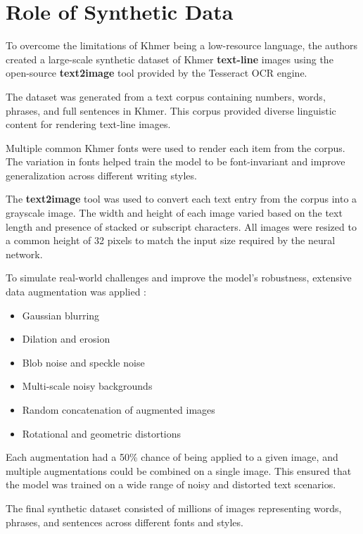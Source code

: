 \section{Role of Synthetic Data}
\label{sec:dl-models}

To overcome the limitations of Khmer being a low-resource language, 
the authors created a large-scale synthetic dataset of Khmer \textbf{text-line} 
images using the open-source \textbf{text2image} tool provided by the Tesseract OCR engine.

The dataset was generated from a text corpus containing numbers, words, phrases, 
and full sentences in Khmer. \citep{buoy2021seq2seq} This corpus provided diverse linguistic content 
for rendering text-line images.

Multiple common Khmer fonts were used to render each item from the corpus. 
The variation in fonts helped train the model to be font-invariant and improve 
generalization across different writing styles.

The \textbf{text2image} tool was used to convert each text entry from the corpus into a 
grayscale image. The width and height of each image varied based on the text 
length and presence of stacked or subscript characters. All images were 
resized to a common height of 32 pixels to match the input size required 
by the neural network.

To simulate real-world challenges and improve the model's robustness, 
extensive data augmentation was applied \citep{buoy2021seq2seq} :
    \begin{itemize}
        \item Gaussian blurring
        \item Dilation and erosion
        \item Blob noise and speckle noise
        \item Multi-scale noisy backgrounds
        \item Random concatenation of augmented images
        \item Rotational and geometric distortions
    \end{itemize}

Each augmentation had a 50\% \citep{buoy2021seq2seq} chance of being applied to a given image, and multiple augmentations could be combined on a single image. This ensured that the model was trained on a wide range of noisy and distorted text scenarios.

The final synthetic dataset consisted of millions of images representing words, 
phrases, and sentences across different fonts and styles.


